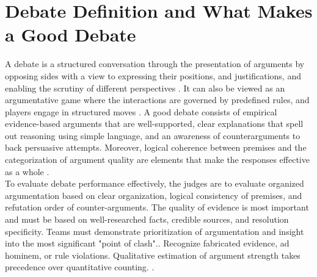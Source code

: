 \documentclass[conference]{IEEEtran}
\begin{document}
\section{Debate Definition and What Makes a Good Debate}
A debate is a structured conversation through the presentation of arguments by opposing sides with a view to expressing their positions, and justifications, and enabling the scrutiny of different perspectives \cite{b1}\cite{b2}. It can also be viewed as an argumentative game where the interactions are governed by predefined rules, and players engage in structured moves \cite{b6}. A good debate consists of empirical evidence-based arguments that are well-supported, clear explanations that spell out reasoning using simple language, and an awareness of counterarguments to back persuasive attempts. Moreover, logical coherence between premises and the categorization of argument quality are elements that make the responses effective as a whole \cite{b6}. \\
To evaluate debate performance effectively, the judges are to evaluate organized argumentation based on clear organization, logical consistency of premises, and refutation order of counter-arguments. The quality of evidence is most important and must be based on well-researched facts, credible sources, and resolution specificity. Teams must demonstrate prioritization of argumentation and insight into the most significant "point of clash".\cite{b8}. Recognize fabricated evidence, ad hominem, or rule violations. Qualitative estimation of argument strength takes precedence over quantitative counting. \cite{b7}\cite{b8}.
\end{document}
